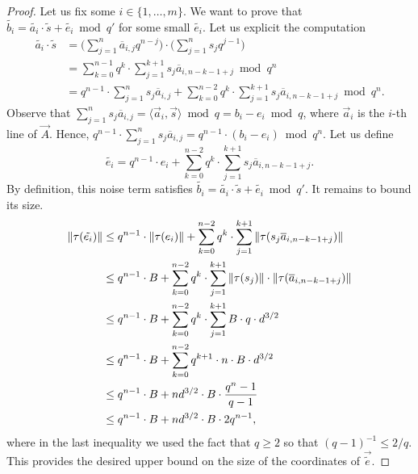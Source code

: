 \begin{proof}
Let us fix some $i \in \{1,\dots,m\}$. We want to prove that $\tilde{b_i} = \tilde{a_i} \cdot \tilde{s} + \tilde{e_i}\bmod q'$ for some small $\tilde{e_i}$. Let us explicit the computation
\begin{align*}
\tilde{a_i} \cdot \tilde{s} &= \Big(\sum_{j = 1}^n \overline{a}_{i,j} q^{n-j} \Big) \cdot \Big( \sum_{j=1}^n s_j q^{j-1}\Big) \\
&= \sum_{k = 0}^{n-1} q^k \cdot \sum_{j = 1}^{k+1} s_j \overline{a}_{i,n-k-1+j} \bmod q^n\\
&= q^{n-1} \cdot \sum_{j = 1}^n s_j \overline{a}_{i,j} + \sum_{k = 0}^{n-2} q^k \cdot \sum_{j = 1}^{k+1} s_j \overline{a}_{i,n-k-1+j} \bmod q^n.
\end{align*}
Observe that $\sum_{j = 1}^n s_j \overline{a}_{i,j} = \langle \vec a_i, \vec s \rangle \bmod q = b_i-e_i \bmod q$, where $\vec a_i$ is the $i$-th line of $\vec A$. Hence, $q^{n-1} \cdot \sum_{j = 1}^n s_j \overline{a}_{i,j} = q^{n-1} \cdot (b_i - e_i) \bmod q^n$.
Let us define 
\[ \tilde{e_i} = q^{n-1} \cdot e_i + \sum_{k = 0}^{n-2} q^k \cdot \sum_{j = 1}^{k+1} s_j \overline{a}_{i,n-k-1+j}.\]
By definition, this noise term satisfies $\tilde{b_i} = \tilde{a_i} \cdot \tilde{s} + \tilde{e_i}\bmod q'$. It remains to bound its size.
\begin{align*}
\|\tau(\tilde{e_i})\| & \leq q^{n-1} \cdot \|\tau(e_i)\| + \sum_{k = 0}^{n-2} q^k \cdot \sum_{j = 1}^{k+1} \|\tau(s_j \overline{a}_{i,n-k-1+j})\| \\
&\leq q^{n-1} \cdot B + \sum_{k = 0}^{n-2} q^k \cdot \sum_{j = 1}^{k+1} \|\tau(s_j)\| \cdot \|\tau(\overline{a}_{i,n-k-1+j})\| \\
&\leq q^{n-1} \cdot B + \sum_{k = 0}^{n-2} q^k \cdot \sum_{j = 1}^{k+1} B \cdot q \cdot d^{3/2} \\
&\leq q^{n-1} \cdot B + \sum_{k = 0}^{n-2} q^{k+1} \cdot n \cdot B \cdot d^{3/2} \\
&\leq q^{n-1} \cdot B + nd^{3/2} \cdot B \cdot \frac{q^{n}-1}{q-1} \\
&\leq q^{n-1} \cdot B + nd^{3/2} \cdot B \cdot 2q^{n-1},
\end{align*}
where in the last inequality we used the fact that $q \geq 2$ so that $(q-1)^{-1} \leq 2/q$. This provides the desired upper bound on the size of the coordinates of $\vec{\tilde{e}}$.
\end{proof}





